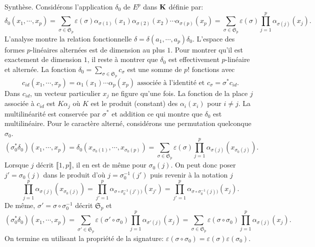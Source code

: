 \begin{demo}
Synthèse.
Considérons l'application $\delta_0$ de $E^p$ dans $\mathbf{K}$ définie par:
\begin{displaymath}
\delta_0(x_1,\cdots,x_p)=  
\sum_{\sigma\in \mathfrak{S}_p}\varepsilon(\sigma)\alpha_{\sigma(1)}(x_1)\alpha_{\sigma(2)}(x_2)\cdots \alpha_{\sigma(p)}(x_p)
= \sum_{\sigma\in \mathfrak{S}_p}\varepsilon(\sigma) \prod_{j=1}^p\alpha_{\sigma(j)}(x_j).
\end{displaymath}
L'analyse montre la relation fonctionnelle $\delta = \delta(a_1,\cdots,a_p)\delta_0$. L'espace des formes $p$-linéaires alternées est de dimension au plus $1$. Pour montrer qu'il est exactement de dimension $1$, il reste à montrer que $\delta_0$ est effectivement $p$-linéaire et alternée.\newline
La fonction $\delta_0 = \sum_{\sigma \in \mathfrak{S}_p}c_\sigma$ est une somme de $p!$ fonctions avec 
\[
  c_{id}(x_1, \cdots, x_p) = \alpha_1(x_1)\cdots \alpha_p(x_p) \text{ associée à l'identité et } c_\sigma = \sigma^* c_{id}.
\]
Dans $c_{id}$, un vecteur particulier $x_j$ ne figure qu'une fois. La fonction de la place $j$ associée à $c_{id}$ est $K \alpha_j$ où $K$ est le produit (constant) des $\alpha_i(x_i)$ pour $i\neq j$. La multilinéarité est conservée par $\sigma^*$ et addition ce qui montre que $\delta_0$ est multilinéaire.\newline
Pour le caractère alterné, considérons une permutation quelconque $\sigma_0$.
\begin{displaymath}
 (\sigma_0^*\delta_0)(x_1,\cdots,x_p)=\delta_0(x_{\sigma_0(1)},\cdots,x_{\sigma_0(p)})
= \sum_{\sigma\in \mathfrak{S}_p}\varepsilon(\sigma) \prod_{j=1}^p\alpha_{\sigma(j)}(x_{\sigma_0(j)}).
\end{displaymath}
Lorsque $j$ décrit $\llbracket 1,p\rrbracket$, il en est de même pour $\sigma_0(j)$. On peut donc poser $j'=\sigma_0(j)$ dans le produit d'où $j=\sigma_0^{-1}(j')$ puis revenir à la notation $j$
\begin{displaymath}
\prod_{j=1}^p\alpha_{\sigma(j)}(x_{\sigma_0(j)})
= \prod_{j'=1}^p\alpha_{\sigma\circ \sigma_0^{-1}(j'))}(x_{j'}) 
= \prod_{j'=1}^p\alpha_{\sigma\circ \sigma_0^{-1}(j))}(x_{j}) .
\end{displaymath}
De même, $\sigma' = \sigma \circ \sigma_0^{-1}$ décrit $\mathfrak{S}_p $ et
\begin{displaymath}
 (\sigma_0^*\delta_0)(x_1,\cdots,x_p)
= \sum_{\sigma'\in \mathfrak{S}_p}\varepsilon(\sigma'\circ \sigma_0) \prod_{j=1}^p\alpha_{\sigma'(j)}(x_{j}) 
= \sum_{\sigma\in \mathfrak{S}_p}\varepsilon(\sigma\circ \sigma_0) \prod_{j=1}^p\alpha_{\sigma(j)}(x_{j}) .
\end{displaymath}
On termine en utilisant la propriété de la signature:  $\varepsilon(\sigma\circ \sigma_0)=\varepsilon(\sigma)\varepsilon(\sigma_0)$.
\end{demo}
